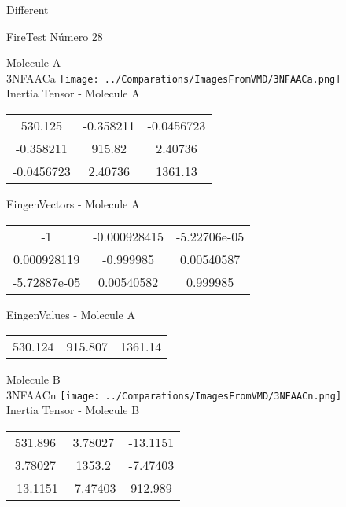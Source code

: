 \begin{center}
\vtab
\vtab
\textcolor{NavyBlue}{\Large Different}
\end{center}

 \newpage

\vtab[-2cm]
\begin{center}
{\large FireTest \tab Número 28}
\end{center}
\begin{multicols}{2}
\begin{center}

Molecule A \\ 
3NFAACa
\texttt{[image: ../Comparations/ImagesFromVMD/3NFAACa.png]}
\\
Inertia Tensor - Molecule A \\
\vtab

\begin{tabular}{|c c c|}
530.125	 & 	-0.358211	 & 	-0.0456723	 \\
-0.358211	 & 	915.82	 & 	2.40736	 \\
-0.0456723	 & 	2.40736	 & 	1361.13
\end{tabular}

\vtab
 EingenVectors - Molecule A     \\
\vtab
\begin{tabular}{|c c c|}
-1	 & 	-0.000928415	 & 	-5.22706e-05	 \\
0.000928119	 & 	-0.999985	 & 	0.00540587	 \\
-5.72887e-05	 & 	0.00540582	 & 	0.999985
\end{tabular}

\vtab
 EingenValues - Molecule A     \\
\vtab
\begin{tabular}{|c c c|}
530.124	 & 	915.807	 & 	1361.14	 \\
\end{tabular}
\columnbreak

Molecule B \\ 
3NFAACn
\texttt{[image: ../Comparations/ImagesFromVMD/3NFAACn.png]}
\\
Inertia Tensor - Molecule B \\
\vtab

\begin{tabular}{|c c c|}
531.896	 & 	3.78027	 & 	-13.1151	 \\
3.78027	 & 	1353.2	 & 	-7.47403	 \\
-13.1151	 & 	-7.47403	 & 	912.989
\end{tabular}


\end{center}
\end{multicols}
